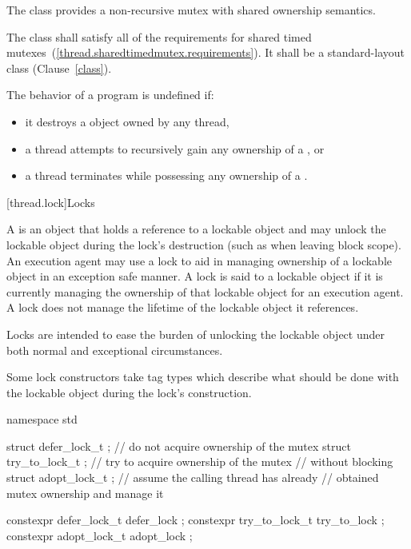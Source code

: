 \pnum
The class  provides a non-recursive mutex with shared
ownership semantics.

\pnum
The class  shall satisfy all of the
requirements for shared timed mutexes~(\ref{thread.sharedtimedmutex.requirements}).
It shall be a standard-layout class (Clause~\ref{class}).

\pnum
The behavior of a program is undefined if:
\begin{itemize}
\item it destroys a  object owned by any thread,
\item a thread attempts to recursively gain any ownership of a , or
\item a thread terminates while possessing any ownership of a .
\end{itemize}

[thread.lock]{Locks}

\pnum
A  is an object that holds a reference to a lockable object and may unlock the
lockable object during the lock's destruction (such as when leaving block scope). An execution
agent may use a lock to aid in managing ownership of a lockable object in an exception safe
manner. A lock is said to  a lockable object if it is currently managing the
ownership of that lockable object for an execution agent. A lock does not manage the lifetime
of the lockable object it references. \begin{note} Locks are intended to ease the burden of
unlocking the lockable object under both normal and exceptional circumstances. \end{note}

\pnum
Some lock constructors take tag types which describe what should be done with the lockable
object during the lock's construction.

%
%
%
%
%
%
\begin{codeblock}
namespace std {
  struct defer_lock_t  { };     // do not acquire ownership of the mutex
  struct try_to_lock_t { };     // try to acquire ownership of the mutex
                                // without blocking
  struct adopt_lock_t  { };     // assume the calling thread has already
                                // obtained mutex ownership and manage it

  constexpr defer_lock_t   defer_lock { };
  constexpr try_to_lock_t  try_to_lock { };
  constexpr adopt_lock_t   adopt_lock { };
}
\end{codeblock}

